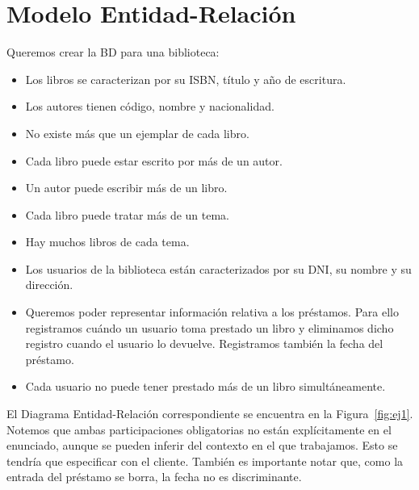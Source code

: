 \section{Modelo Entidad-Relación}

\begin{ejercicio} \label{ej:1}
    Queremos crear la BD para una biblioteca:
    \begin{itemize}
        \item Los libros se caracterizan por su ISBN, título y año de escritura.
        \item Los autores tienen código, nombre y nacionalidad.
        \item No existe más que un ejemplar de cada libro.
        \item Cada libro puede estar escrito por más de un autor.
        \item Un autor puede escribir más de un libro.
        \item Cada libro puede tratar más de un tema.
        \item Hay muchos libros de cada tema.
        \item Los usuarios de la biblioteca están caracterizados por su DNI, su nombre y su dirección.
        \item Queremos poder representar información relativa a los préstamos. Para ello registramos cuándo un usuario toma prestado un libro y eliminamos dicho registro cuando el usuario lo devuelve. Registramos también la fecha del préstamo.
        \item Cada usuario no puede tener prestado más de un libro simultáneamente.
    \end{itemize}
    
    El Diagrama Entidad-Relación correspondiente se encuentra en la Figura~\ref{fig:ej1}.
    Notemos que ambas participaciones obligatorias no están explícitamente en el enunciado,
    aunque se pueden inferir del contexto en el que trabajamos. Esto se tendría que especificar con el cliente.
    También es importante notar que, como la entrada del préstamo se borra, la fecha no es discriminante. 
    \begin{figure}
        \centering
\end{figure}
\end{ejercicio}

